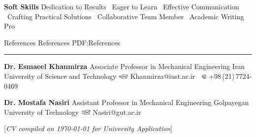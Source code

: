 \documentclass[letterpaper,MMMyyyy]{CVTemplate}
\newcommand{\CVNote}{CV compiled on {\today} for University Application}
\begin{document}
\begin{Body}
\vspace{6pt}
\BulletItem
\textbf{Soft Skills}
\newline
Dedication to Results 
\textbullet\ Eager to Learn 
\textbullet\ Effective Communication 
\textbullet\ Crafting Practical Solutions 
\textbullet\ Collaborative Team Member
\textbullet\ Academic Writing Pro

%
%



\Section
{References}
{References}
{PDF:References}
\textcolor{Forestg}{\vspace{0.10cm}\hrule height 0.1cm}\BigGap\Gap
\BulletItem
\textbf{Dr. Esmaeel Khanmirza}
\newline
Associate Professor in Mechanical Engineering
\newline
Iran University of Science and Technology
\newline
\includegraphics[height=7pt]{icons/SendEmail.png} Khanmirza@iust.ac.ir
\,\SubBulletSymbol\,
\includegraphics[height=7pt]{icons/phone1.png} +98\,(21)\,7724-0469

\BigGap
\BulletItem
\textbf{Dr. Mostafa Nasiri}
\newline
Assistant Professor in Mechanical Engineering
\newline
Golpayegan University of Technology
\newline
\includegraphics[height=7pt]{icons/SendEmail.png} Nasiri@gut.ac.ir

\end{Body}


\UseNoteFont%
\hfill%
[\textit{\CVNote}]
\end{document}
